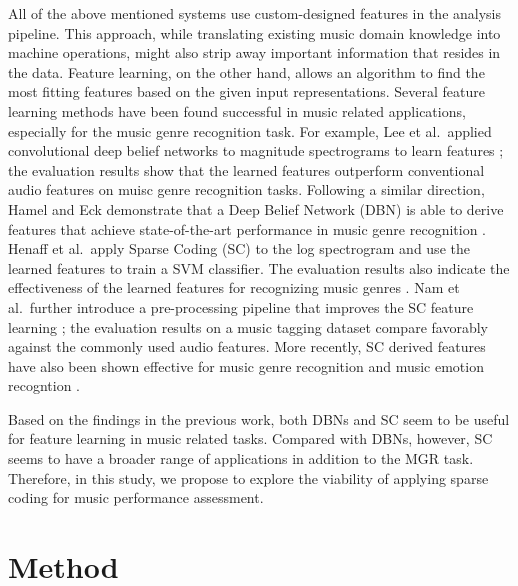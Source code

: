 \documentclass[conference]{IEEEtran}
\begin{document}
All of the above mentioned systems use custom-designed features in the analysis pipeline. This approach, while translating existing music domain knowledge into machine operations, might also strip away important information that resides in the data. Feature learning, on the other hand, allows an algorithm to find the most fitting features based on the given input representations. Several feature learning methods have been found successful in music related applications, especially for the music genre recognition task. For example, Lee et al.\  applied convolutional deep belief networks to magnitude spectrograms to learn features \cite{Lee2009a}; the evaluation results show that the learned features outperform conventional audio features on muisc genre recognition tasks. Following a similar direction, Hamel and Eck demonstrate that a Deep Belief Network (DBN) is able to derive features that achieve state-of-the-art performance in music genre recognition \cite{Hamel2010}. 
Henaff et al.\  apply Sparse Coding (SC) to the log spectrogram and use the learned features to train a SVM classifier. The evaluation results also indicate the effectiveness of the learned features for recognizing music genres \cite{Henaff2011}. Nam et al.\  further introduce a pre-processing pipeline that improves the SC feature learning \cite{Nam2012}; the evaluation results on a music tagging dataset compare favorably against the commonly used audio features. More recently, SC derived features have also been shown effective for music genre recognition \cite{Hsu2016} and music emotion recogntion \cite{OBrien2015}. 

Based on the findings in the previous work, both DBNs and SC seem to be useful for feature learning in music related tasks. Compared with DBNs, however, SC seems to have a broader range of applications in addition to the MGR task. Therefore, in this study, we propose to explore the viability of applying sparse coding for music performance assessment.

\section{Method}\label{sec:method}
\end{document}
